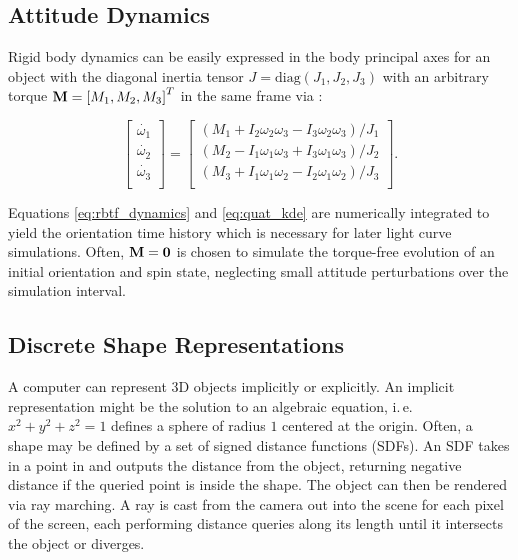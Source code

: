 \subsection{Attitude Dynamics}

Rigid body dynamics can be easily expressed in the body principal axes for an object with the diagonal inertia tensor $J = \mathrm{diag}\left( J_1, J_2, J_3 \right)$ with an arbitrary torque $\mathbf{M} = \left[M_1, M_2, M_3\right]^T$ in the same frame via \cite{crassidis1ed}:

\begin{equation} \label{eq:rbtf_dynamics}
    \left[\begin{matrix}\dot{\omega_1}\\\dot{\omega_2}\\\dot{\omega_3}\\\end{matrix}\right]
    =
    \left[\begin{matrix}
        \left(M_1+I_2\omega_2\omega_3-I_3\omega_2\omega_3\right) / J_1 \\
        \left(M_2-I_1\omega_1\omega_3+I_3\omega_1\omega_3\right) / J_2 \\
        \left(M_3+I_1\omega_1\omega_2-I_2\omega_1\omega_2\right) / J_3 \\
    \end{matrix}\right].
\end{equation}

Equations \ref{eq:rbtf_dynamics} and \ref{eq:quat_kde} are numerically integrated to yield the orientation time history which is necessary for later light curve simulations. Often, $\mathbf{M} = \mathbf{0}$ is chosen to simulate the torque-free evolution of an initial orientation and spin state, neglecting small attitude perturbations over the simulation interval.

\subsection{Discrete Shape Representations}

A computer can represent 3D objects implicitly or explicitly. An implicit representation might be the solution to an algebraic equation, i.\,e.\, $x^2 + y^2 + z^2 = 1$ defines a sphere of radius $1$ centered at the origin. Often, a shape may be defined by a set of signed distance functions (SDFs). An SDF takes in a point in \rthree and outputs the distance from the object, returning negative distance if the queried point is inside the shape. The object can then be rendered via ray marching. A ray is cast from the camera out into the scene for each pixel of the screen, each performing distance queries along its length until it intersects the object or diverges. 

